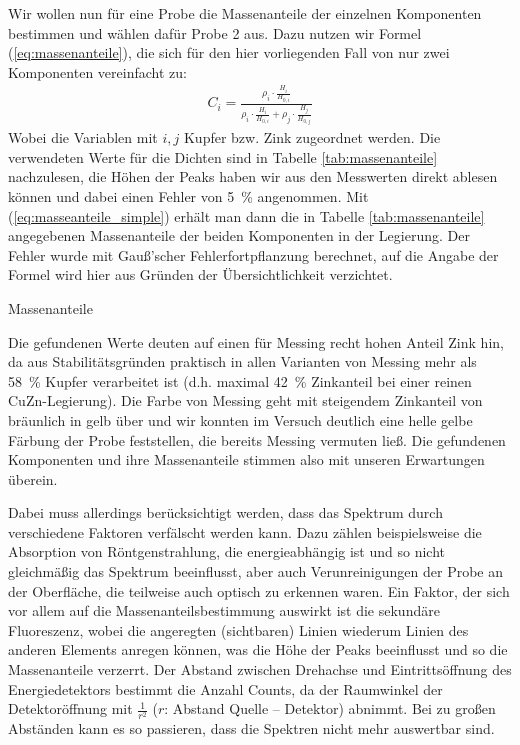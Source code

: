 \documentclass[11pt, a4paper]{article}
\begin{document}
Wir wollen nun für eine Probe die Massenanteile der einzelnen Komponenten bestimmen und wählen dafür Probe 2 aus.
Dazu nutzen wir Formel (\ref{eq:massenanteile}), die sich für den hier vorliegenden Fall von nur zwei Komponenten vereinfacht zu:
\begin{align}
C_i = \frac{\rho_i \cdot \frac{H_i}{H_{0,i}}}{\rho_i \cdot \frac{H_i}{H_{0,i}}+\rho_j \cdot \frac{H_j}{H_{0,j}}}
\label{eq:masseanteile_simple}
\end{align}
Wobei die Variablen mit $i, j$ Kupfer bzw. Zink zugeordnet werden.
Die verwendeten Werte für die Dichten sind in Tabelle \ref{tab:massenanteile} nachzulesen, die Höhen der Peaks haben wir aus den Messwerten direkt ablesen können und dabei einen Fehler von \SI{5}{\percent} angenommen.
Mit (\ref{eq:masseanteile_simple}) erhält man dann die in Tabelle \ref{tab:massenanteile} angegebenen Massenanteile der beiden Komponenten in der Legierung.
Der Fehler wurde mit Gauß'scher Fehlerfortpflanzung berechnet, auf die Angabe der Formel wird hier aus Gründen der Übersichtlichkeit verzichtet.

\begin{table}[h]
\centering

\caption{Massenanteile}
\label{tab:massenanteile}
\end{table}

Die gefundenen Werte deuten auf einen für Messing recht hohen Anteil Zink hin, da aus Stabilitätsgründen praktisch in allen Varianten von Messing mehr als \SI{58}{\percent} Kupfer verarbeitet ist (d.h. maximal \SI{42}{\percent} Zinkanteil bei einer reinen CuZn-Legierung).
Die Farbe von Messing geht mit steigendem Zinkanteil von bräunlich in gelb über und wir konnten im Versuch deutlich eine helle gelbe Färbung der Probe feststellen, die bereits Messing vermuten ließ.
Die gefundenen Komponenten und ihre Massenanteile stimmen also mit unseren Erwartungen überein.

Dabei muss allerdings berücksichtigt werden, dass das Spektrum durch verschiedene Faktoren verfälscht werden kann.
Dazu zählen beispielsweise die Absorption von Röntgenstrahlung, die energieabhängig ist und so nicht gleichmäßig das Spektrum beeinflusst, aber auch Verunreinigungen der Probe an der Oberfläche, die teilweise auch optisch zu erkennen waren.
Ein Faktor, der sich vor allem auf die Massenanteilsbestimmung auswirkt ist die sekundäre Fluoreszenz, wobei die angeregten (sichtbaren) Linien wiederum Linien des anderen Elements anregen können, was die Höhe der Peaks beeinflusst und so die Massenanteile verzerrt.
Der Abstand zwischen Drehachse und Eintrittsöffnung des Energiedetektors bestimmt die Anzahl Counts, da der Raumwinkel der Detektoröffnung mit $\frac{1}{r^2}$ ($r$: Abstand Quelle -- Detektor) abnimmt.
Bei zu großen Abständen kann es so passieren, dass die Spektren nicht mehr auswertbar sind. 
\end{document}
